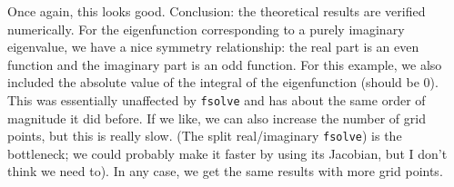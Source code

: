 \documentclass[12pt]{article}
\begin{document}
Once again, this looks good. Conclusion: the theoretical results are verified numerically. For the eigenfunction corresponding to a purely imaginary eigenvalue, we have a nice symmetry relationship: the real part is an even function and the imaginary part is an odd function. For this example, we also included the absolute value of the integral of the eigenfunction (should be 0). This was essentially unaffected by \texttt{fsolve} and has about the same order of magnitude it did before. If we like, we can also increase the number of grid points, but this is really slow. (The split real/imaginary \texttt{fsolve}) is the bottleneck; we could probably make it faster by using its Jacobian, but I don't think we need to). In any case, we get the same results with more grid points.
\end{document}
